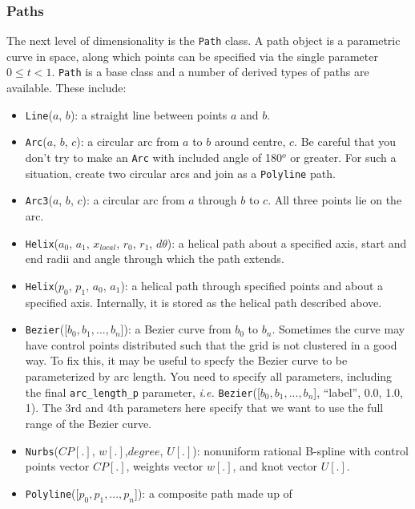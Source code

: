 \subsubsection{Paths}
%
The next level of dimensionality is the \texttt{Path} class.
A path object is a parametric curve in space, 
along which points can be specified via the single parameter $0 \le t < 1$.
\texttt{Path} is a base class and a number of derived types of paths are available.
These include:
\begin{itemize}
\item \texttt{Line}($a$, $b$): a straight line between points $a$ and $b$.
\item \texttt{Arc}($a$, $b$, $c$): a circular arc from $a$ to $b$ around centre,
  $c$.
  Be careful that you don't try to make an \texttt{Arc} with included angle of 180$^o$ or greater.
  For such a situation, create two circular arcs and join as a \texttt{Polyline} path.
\item \texttt{Arc3}($a$, $b$, $c$): a circular arc from $a$ through $b$ to $c$.
  All three points lie on the arc.
\item \texttt{Helix}($a_0$, $a_1$, $x_{local}$, $r_0$, $r_1$, $d\theta$): a helical path
  about a specified axis, start and end radii and angle through which the path extends.
\item \texttt{Helix}($p_0$, $p_1$, $a_0$, $a_1$): a helical path through specified points
  and about a specified axis.
  Internally, it is stored as the helical path described above.
\item \texttt{Bezier}([$b_0, b_1, ..., b_n$]): a Bezier curve from $b_0$ to
  $b_n$.
  Sometimes the curve may have control points distributed such that the grid is not clustered in a good way.
  To fix this, it may be useful to specfy the Bezier curve to be parameterized by arc length.
  You need to specify all parameters, including the final \texttt{arc\_length\_p} parameter, \textit{i.e.}
  \texttt{Bezier}([$b_0, b_1, ..., b_n$], ``label'', 0.0, 1.0, 1).
  The 3rd and 4th parameters here specify that we want to use the full range of the Bezier curve.
\item \texttt{Nurbs}($CP[.]$, $w[.]$,$degree$, $U[.]$): nonuniform rational B-spline with
  control points vector $CP[.]$, weights vector $w[.]$, and knot vector $U[.]$.
\item \texttt{Polyline}([$p_0, p_1, ..., p_n$]): a composite path made up of 

\end{itemize}
